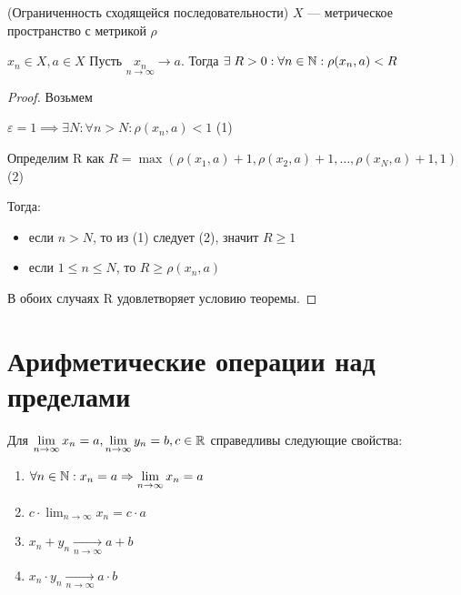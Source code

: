 \begin{theorem} (Ограниченность сходящейся последовательности)
    $X$ --- метрическое пространство с метрикой $\rho$

    $x_n \in X, a \in X$
    Пусть $\underset{n \to \infty}{x_n} \to a$. Тогда $\exists\; R > 0: \forall n \in \mathbb{N}: \rho(x_n, a) < R$
    
\end{theorem}

\begin{proof}
    Возьмем \item $\varepsilon = 1 \implies \exists N: \forall n > N: \rho(x_n, a) < 1$ (1)

    Определим R как $R = \max(\rho(x_1, a) + 1, \rho(x_2, a) + 1, \ldots, \rho(x_N, a) + 1, 1)$ (2)

    Тогда:

    \begin{itemize}
        \item если $n > N$, то из (1) следует (2), значит $R \ge 1$ 
        \item если $1 \le n \le N$, то $R \ge \rho(x_n, a)$
    \end{itemize}

    В обоих случаях R удовлетворяет условию теоремы.
\end{proof}

\section{Арифметические операции над пределами}

\begin{properties}
    Для $\lim_{n \to \infty} x_n = a, \lim_{n \to \infty} y_n = b, c \in \R$ справедливы следующие свойства:
    \begin{enumerate}
        \item $\forall n \in \N: x_n = a \implies \lim_{n \to \infty} x_n = a$
        \item $c \cdot \lim_{n \to \infty} x_n = c \cdot a$
        \item $x_n + y_n \underset{n \to \infty}{\to} a + b$
        \item $x_n \cdot y_n \underset{n \to \infty}{\to} a \cdot b$
    \end{enumerate}
\end{properties}

